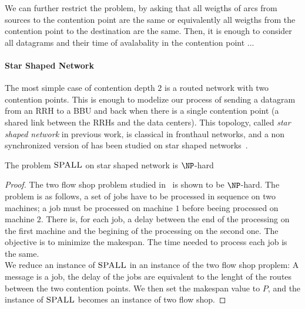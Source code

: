 \documentclass[english]{article}
\begin{document}
   
   


We can further restrict the problem, by asking that all weigths of arcs from sources to the contention point
are the same or equivalently all weigths from the contention point to the destination are the same. 
Then, it is enough to consider all datagrams and their time of avalabality in the contention point ...

\paragraph*{Star Shaped Network}

The most simple case of contention depth $2$ is a routed network with two contention points. 
This is enough to modelize our process of sending a datagram from an RRH to a BBU and back when
there is a single contention point (a shared link between the RRHs and the data centers). 
This topology, called \emph{star shaped network} in previous work, is classical in fronthaul networks, and a non synchronized version of \spall has been studied on star shaped networks~\cite{Guir1806:Deterministic,barth2018deterministic,guiraud2020scheduling}.


 \begin{theorem}\label{th:braFPT}
The problem $\textsc{SPALL}$ on star shaped network is $\NP$-hard
\end{theorem}
\begin{proof}
The two flow shop problem studied in~\cite{yu2004minimizing} is shown to be $\NP$-hard. The problem is as follows, a set of jobs have to be processed in sequence on two machines; a job must be processed on machine $1$ before beeing processed on machine $2$. There is, for each job, a delay between the end of the processing on the first machine and the begining of the processing on the second one. The objective is to minimize the makespan. The time needed to process each job is the same.\\
We reduce an instance of $\textsc{SPALL}$ in an instance of the two flow shop proplem: A message is a job, the delay of the jobs are equivalent to the lenght of the routes between the two contention points. We then set the makespan value to $P$, and the instance of $\textsc{SPALL}$ becomes an instance of two flow shop.
\end{proof}
\end{document}

